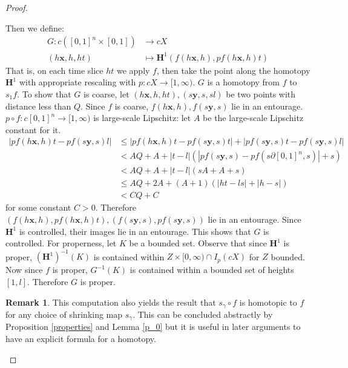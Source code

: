 \documentclass[a4paper,11pt]{article}
\theoremstyle{definition}
\newtheorem*{remark}{Remark}
\theoremstyle{plain}
\theoremstyle{remark}
\begin{document}
{\begin{proof}
\begin{enumerate}
Then we define:
\begin{align*}
G: c([0,1]^n\times [0,1])&\rightarrow cX\\
(h\mathbf{x},h,ht)&\mapsto \mathbf{H}^{1}(f(h\mathbf{x},h), pf(h\mathbf{x},h)t)
\end{align*}
That is, on each time slice $ht$ we apply $f$, then take the point along the homotopy $\mathbf{H}^{1}$ with appropriate rescaling with $p: cX\rightarrow [1,\infty)$. $G$ is a homotopy from $f$ to $s_{1} f$. To show that $G$ is coarse, let $(h\mathbf{x},h,ht), (s\mathbf{y},s,sl)$ be two points with distance less than $Q$. Since $f$ is coarse, $f(h\mathbf{x},h), f(s\mathbf{y},s)$ lie in an entourage. $p\circ f: c[0,1]^n\rightarrow [1,\infty)$ is large-scale Lipschitz: let $A$ be the large-scale Lipschitz constant for it. 
\begin{align*}
|pf(h\mathbf{x},h)t-pf(s\mathbf{y},s)l|&\leq |pf(h\mathbf{x},h)t-pf(s\mathbf{y},s)t|+|pf(s\mathbf{y},s)t-pf(s\mathbf{y},s)l|\\
&< AQ+A + |t-l| (|pf(s\mathbf{y},s) - pf (s \partial [0,1]^n,s)|+s)\\
&< AQ+A+ |t-l|(sA+A+s)\\
&\leq AQ+2A+(A+1)(|ht-ls|+|h-s|)\\
&< CQ +C
\end{align*} 
for some constant $C>0$. Therefore $(f(h\mathbf{x},h), pf(h\mathbf{x},h)t), (f(s\mathbf{y},s), pf(s\mathbf{y},s))$ lie in an entourage. Since $\mathbf{H}^{1}$ is controlled, their images lie in an entourage. This shows that $G$ is controlled. For properness, let $K$ be a bounded set. Observe that since $\mathbf{H}^{1}$ is proper, $(\mathbf{H}^{1})^{-1}(K)$ is contained within $Z\times [0,\infty)\cap I_{p}(cX)$ for $Z$ bounded. Now since $f$ is proper, $G^{-1}(K)$ is contained within a bounded set of heights $[1,l]$. Therefore $G$ is proper.  

\begin{remark} This computation also yields the result that $s_{\gamma}\circ f$ is homotopic to $f$ for any choice of shrinking map $s_{\gamma}$. This can be concluded abstractly by Proposition \ref{properties} and Lemma \ref{p_0} but it is  useful in later arguments to have an explicit formula for a homotopy.
\end{remark}


\end{enumerate}
\end{proof}}
\end{document}
